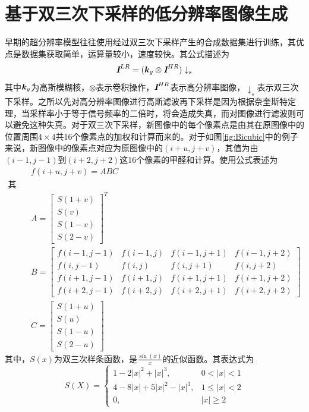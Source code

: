 \section{基于双三次下采样的低分辨率图像生成}
早期的超分辨率模型往往使用经过双三次下采样产生的合成数据集进行训练，其优点是数据集获取简单，运算量较小，速度较快。其公式描述为
\begin{equation}
    \textbf{\em I}^{LR}=(\vb*{k}_g\otimes \textbf{\em I}^{HR})\downarrow_s\label{equ:bicubic}
\end{equation}
其中$\vb*{k}_g$为高斯模糊核，$\otimes$表示卷积操作，$\textbf{\em I}^{HR}$表示高分辨率图像，$\downarrow_s$表示双三次下采样。之所以先对高分辨率图像进行高斯滤波再下采样是因为根据奈奎斯特定理，当采样率小于等于信号频率的二倍时，将会造成失真，而对图像进行滤波则可以避免这种失真。对于双三次下采样，新图像中的每个像素点是由其在原图像中的位置周围$4\times4$共16个像素点的加权和计算而来的。对于如图\ref{fig:Bicubic}中的例子来说，新图像中的像素点对应为原图像中的$(i+u,j+v)$，其值为由$(i-1,j-1)$到$(i+2,j+2)$这16个像素的甲醛和计算。使用公式表述为
\begin{equation}
    \begin{split}
        &f(i+u,j+v)=ABC\\
        \text{其中}\\
        &A=
        \left[\begin{array}{c}
            S(1+v) \\
            S(v) \\
            S(1-v) \\
            S(2-v)
        \end{array}\right]^T\\
        &B=
        \left[\begin{array}{cccc}
            f(i-1,j-1) & f(i-1,j) & f(i-1,j+1) & f(i-1,j+2) \\
            f(i,j-1) & f(i,j) & f(i,j+1) & f(i,j+2) \\
            f(i+1,j-1) & f(i+1,j) & f(i+1,j+1) & f(i+1,j+2) \\
            f(i+2,j-1) & f(i+2,j) & f(i+2,j+1) & f(i+2,j+2)
        \end{array}\right]\\
        &C=
        \left[\begin{array}{c}
            S(1+u) \\
            S(u) \\
            S(1-u) \\
            S(2-u)
        \end{array}\right]
    \end{split}
\end{equation}
其中，$S(x)$为双三次样条函数，是$\frac{\sin(x)}{x}$的近似函数。其表达式为
\begin{equation}
    S(X)=
    \begin{cases}
        1-2|x|^2+|x|^3,&0<|x|<1\\
        4-8|x|+5|x|^2-|x|^3,&1\le|x|<2\\
        0,&|x|\ge2
    \end{cases}
\end{equation}

